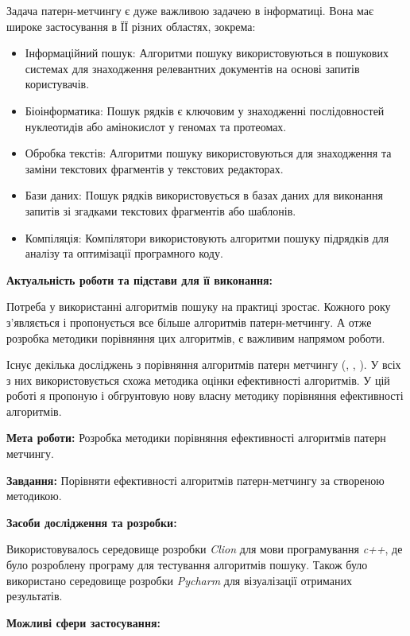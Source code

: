 \documentclass[a4paper,14pt]{extarticle} %
\begin{document}
	Задача патерн-метчингу є дуже важливою задачею в інформатиці. Вона має широке застосування в ЇЇ різних областях, зокрема:
\begin{itemize}
    \item Інформаційний пошук: Алгоритми пошуку використовуються в пошукових системах для
	знаходження релевантних документів на основі запитів користувачів.
    \item Біоінформатика: Пошук рядків є ключовим у знаходженні послідовностей нуклеотидів або амінокислот у геномах та протеомах. \cite{dna}
    \item Обробка текстів: Алгоритми пошуку використовуються для знаходження та заміни текстових фрагментів у текстових редакторах.
    \item Бази даних: Пошук рядків використовується в базах даних для виконання запитів зі згадками текстових фрагментів або шаблонів.
    \item Компіляція: Компілятори використовують алгоритми пошуку підрядків для аналізу та оптимізації програмного коду.

\end{itemize}


\textbf{Актуальність роботи та підстави для її виконання:}

Потреба у використанні алгоритмів пошуку на практиці зростає. Кожного року з'являється і пропонується все більше алгоритмів патерн-метчингу. А отже розробка методики порівняння цих алгоритмів, є важливим напрямом роботи.

Існує декілька досліджень з порівняння алгоритмів патерн метчингу (\cite{smart}, \cite{exact}, \cite{experiment}). У всіх з них використовується схожа методика оцінки ефективності алгоритмів.
У цій роботі я пропоную і обгрунтовую нову власну методику порівняння ефективності алгоритмів.

\textbf{Мета роботи:} Розробка методики порівняння ефективності алгоритмів патерн метчингу.

\textbf{Завдання:} Порівняти ефективності алгоритмів патерн-метчингу за створеною методикою.

\textbf{Засоби дослідження та розробки:}

Використовувалось середовище розробки \textit{Clion} для мови програмування \textit{c++}, де було розроблену програму для тестування алгоритмів пошуку. Також було використано середовище розробки \textit{Pycharm} для візуалізації отриманих результатів.

\textbf{Можливі сфери застосування:}
\end{document}
